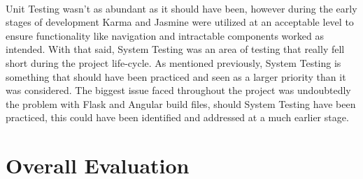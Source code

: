 \paragraph{}
Unit Testing wasn't as abundant as it should have been, however during the early stages of development Karma and Jasmine were utilized at an acceptable level to ensure functionality like navigation and intractable components worked as intended. With that said, System Testing was an area of testing that really fell short during the project life-cycle. As mentioned previously, System Testing is something that should have been practiced and seen as a larger priority than it was considered. The biggest issue faced throughout the project was undoubtedly the problem with Flask and Angular build files, should System Testing have been practiced, this could have been identified and addressed at a much earlier stage.

\section{Overall Evaluation}
